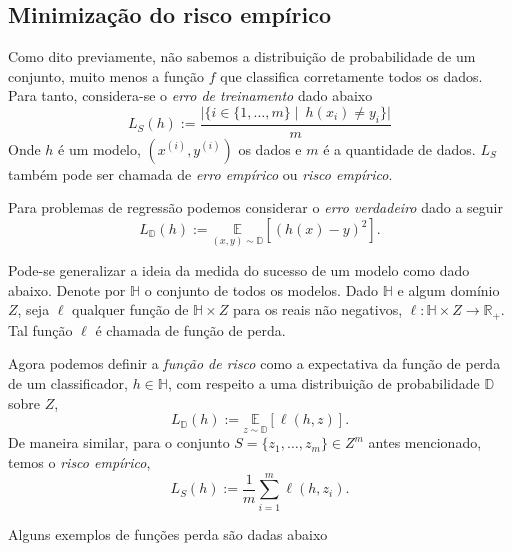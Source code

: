 \documentclass[
	12pt,				%
    oneside,			%
	a4paper,			%
	english,			%
	french,				%
	spanish,			%
	brazil,				%
	]{abntex2}
\begin{document}
            \subsection{Minimização do risco empírico}
                Como dito previamente, não sabemos a distribuição de probabilidade de um conjunto, muito menos a função $f$ que classifica corretamente todos os dados. Para tanto, considera-se o \emph{erro de treinamento} dado abaixo
                \begin{equation*}
                    L_S(h) := \frac{\vert\{ i \in \{1,\dots,m\} \mid\ h(x_i) \neq y_i\}\vert}{m}
                \end{equation*}
                Onde $h$ é um modelo, $(x^{(i)},y^{(i)})$ os dados e $m$ é a quantidade de dados. $L_S$ também pode ser chamada de \emph{erro empírico} ou \emph{risco empírico}.

                Para problemas de regressão podemos considerar o \emph{erro verdadeiro} dado a seguir
                \begin{equation*}
                    L_{\mathbb{D}}(h) := \underset{(x,y) \sim \mathbb{D}}{\mathbb{E}}[(h(x) - y)^2].
                \end{equation*}

                Pode-se generalizar a ideia da medida do sucesso de um modelo como dado abaixo.
                Denote por $\mathbb{H}$ o conjunto de todos os modelos. Dado $\mathbb{H}$ e algum domínio $Z$, seja $\ell$ qualquer função de $\mathbb{H}\times Z$ para os reais não negativos, $\ell:\mathbb{H}\times Z \to \mathbb{R}_{+}$. Tal função $\ell$ é chamada de função de perda.

                Agora podemos definir a \emph{função de risco} como a expectativa da função de perda de um classificador, $h \in \mathbb{H}$, com respeito a uma distribuição de probabilidade $\mathbb{D}$ sobre $Z$,
                \begin{equation*}
                    L_{\mathbb{D}}(h) := \underset{z\sim \mathbb{D}}{\mathbb{E}}[\ell(h,z)].
                \end{equation*}
                 De maneira similar, para o conjunto $S = \{z_1,\dots,z_m\}\in Z^m$ antes mencionado, temos o \emph{risco empírico},
                 \begin{equation*}
                     L_S(h) := \frac{1}{m}\sum_{i=1}^{m}\ell(h,z_i).
                 \end{equation*}

                Alguns exemplos de funções perda são dadas abaixo
\end{document}
